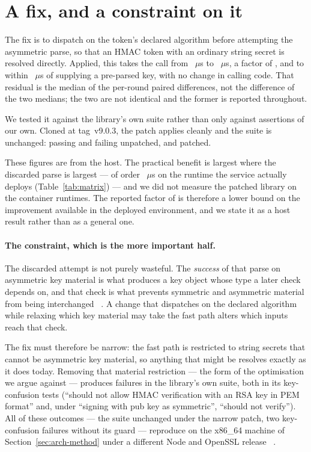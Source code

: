 \documentclass[pdflatex,sn-basic,twocolumn]{sn-jnl}%
\newcommand{\LibraryTag}{tag~v9.0.3}
\newcommand{\NaiveFailingTests}{``should not allow HMAC verification with an RSA
key in PEM format'' and, under ``signing with pub key as symmetric'', ``should
not verify''}
\providecommand{\DIFaddbegin}{} %
\providecommand{\DIFaddend}{} %
\providecommand{\DIFdelbegin}{} %
\providecommand{\DIFdelend}{} %
\newcommand{\DIFscaledelfig}{0.5}
\newlength{\DIFdelgraphicswidth} %
\newlength{\DIFdelgraphicsheight} %
\newcommand{\DIFaddincludegraphics}[2][]{{\color{blue}\fbox{\DIFOincludegraphics[#1]{#2}}}} %
\newcommand{\DIFdelincludegraphics}[2][]{%
\sbox{\DIFdelgraphicsbox}{\DIFOincludegraphics[#1]{#2}}%
\settoboxwidth{\DIFdelgraphicswidth}{\DIFdelgraphicsbox} %
\settoboxtotalheight{\DIFdelgraphicsheight}{\DIFdelgraphicsbox} %
\scalebox{\DIFscaledelfig}{%
\parbox[b]{\DIFdelgraphicswidth}{\usebox{\DIFdelgraphicsbox}\\[-\baselineskip] \rule{\DIFdelgraphicswidth}{0em}}\llap{\resizebox{\DIFdelgraphicswidth}{\DIFdelgraphicsheight}{%
\setlength{\unitlength}{\DIFdelgraphicswidth}%
\begin{picture}(1,1)%
\thicklines\linethickness{2pt} %
{\color[rgb]{1,0,0}\put(0,0){\framebox(1,1){}}}%
{\color[rgb]{1,0,0}\put(0,0){\line( 1,1){1}}}%
{\color[rgb]{1,0,0}\put(0,1){\line(1,-1){1}}}%
\end{picture}%
}\hspace*{3pt}}} %
} %
\DeclareRobustCommand{\DIFaddbegin}{\DIFOaddbegin \let\includegraphics\DIFaddincludegraphics} %
\DeclareRobustCommand{\DIFaddend}{\DIFOaddend \let\includegraphics\DIFOincludegraphics} %
\DeclareRobustCommand{\DIFdelbegin}{\DIFOdelbegin \let\includegraphics\DIFdelincludegraphics} %
\DeclareRobustCommand{\DIFdelend}{\DIFOaddend \let\includegraphics\DIFOincludegraphics} %
\begin{document}
\section{A fix, and a constraint on it}\label{sec:fix}

The fix is to dispatch on the token's declared algorithm before attempting the
asymmetric parse, so that an HMAC token with an ordinary string secret is
resolved directly. Applied, this takes the call from \HostJwtString~$\mu$s to
\HostJwtStringSafe~$\mu$s, a factor of \HostSafePatchRatio, and to within
\HostSafePatchResidual~$\mu$s of supplying a pre-parsed key, with no change in
calling code. That residual is the median of the per-round paired differences,
not the difference of the two medians; the two are not identical and the former
is reported throughout.

We tested it against the library's own suite rather than only against assertions
of our own. Cloned at \LibraryTag, the patch applies cleanly and the suite is
unchanged: \SuiteStockPassing{} passing and \SuiteStockFailing{} failing
unpatched, \SuitePatchedPassing{} and \SuitePatchedFailing{} patched.

These figures are from the host. The practical benefit is largest where the
discarded parse is largest --- of order \NodeEighteenProbeThrows~$\mu$s on the
runtime the service actually deploys (Table~\ref{tab:matrix}) --- and we did not
measure the patched library on the container runtimes. The reported factor of
\HostSafePatchRatio{} is therefore a lower bound on the improvement available in
the deployed environment, and we state it as a host result rather than as a
general one.

\paragraph{The constraint, which is the more important half.} The discarded
attempt is not purely wasteful. The \emph{success} of that parse on asymmetric
key material is what produces a key object whose type a later check depends on,
and that check is what prevents symmetric and asymmetric material from being
interchanged~\DIFdelbegin %
\DIFdelend \DIFaddbegin \citep{rfc8725}\DIFaddend . A change that dispatches on the declared algorithm
while relaxing which key material may take the fast path alters which inputs
reach that check.

The fix must therefore be narrow: the fast path is restricted to string secrets
that cannot be asymmetric key material, so anything that might be resolves
exactly as it does today. Removing that material restriction --- the form of the
optimisation we argue against --- produces \SuiteNaiveFailing{} failures in the
library's own suite, both in its key-confusion tests
(\NaiveFailingTests). All of these outcomes --- the suite unchanged under the
narrow patch, two key-confusion failures without its guard --- reproduce on the
x86\_64 machine of Section~\ref{sec:arch-method} under a different Node and
OpenSSL release~\DIFdelbegin %
\DIFdelend \DIFaddbegin \citep{artifact2026}\DIFaddend .
\end{document}
